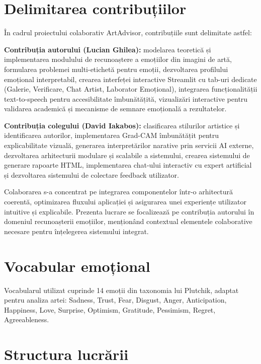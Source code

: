 \section{Delimitarea contribuțiilor}
\label{sec:intro-contributii}

În cadrul proiectului colaborativ ArtAdvisor, contribuțiile sunt delimitate astfel:

\textbf{Contribuția autorului (Lucian Ghilea):} modelarea teoretică și implementarea modulului de recunoaștere a emoțiilor din imagini de artă, formularea problemei multi-etichetă pentru emoții, dezvoltarea profilului emoțional interpretabil, crearea interfeței interactive Streamlit cu tab-uri dedicate (Galerie, Verificare, Chat Artist, Laborator Emoțional), integrarea funcționalității text-to-speech pentru accesibilitate îmbunătățită, vizualizări interactive pentru validarea academică și mecanisme de semnare emoțională a rezultatelor.

\textbf{Contribuția colegului (David Iakabos):} clasificarea stilurilor artistice și identificarea autorilor, implementarea Grad-CAM îmbunătățit pentru explicabilitate vizuală, generarea interpretărilor narative prin servicii AI externe, dezvoltarea arhitecturii modulare și scalabile a sistemului, crearea sistemului de generare rapoarte HTML, implementarea chat-ului interactiv cu expert artificial și dezvoltarea sistemului de colectare feedback utilizator.

Colaborarea s-a concentrat pe integrarea componentelor într-o arhitectură coerentă, optimizarea fluxului aplicației și asigurarea unei experiențe utilizator intuitive și explicabile. Prezenta lucrare se focalizează pe contribuția autorului în domeniul recunoașterii emoțiilor, menționând contextual elementele colaborative necesare pentru înțelegerea sistemului integrat.

\section{Vocabular emoțional}
\label{sec:intro-vocabular}

Vocabularul utilizat cuprinde 14 emoții din taxonomia lui Plutchik, adaptat pentru analiza artei: Sadness, Trust, Fear, Disgust, Anger, Anticipation, Happiness, Love, Surprise, Optimism, Gratitude, Pessimism, Regret, Agreeableness.

\section{Structura lucrării}
\label{sec:intro-structura}

